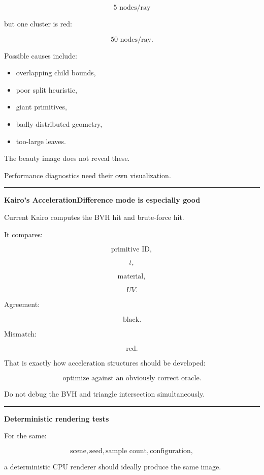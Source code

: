 \[
5\text{ nodes/ray}
\]

but one cluster is red:

\[
50\text{ nodes/ray}.
\]

Possible causes include:

\begin{itemize}
\tightlist
\item
  overlapping child bounds,
\item
  poor split heuristic,
\item
  giant primitives,
\item
  badly distributed geometry,
\item
  too-large leaves.
\end{itemize}

The beauty image does not reveal these.

Performance diagnostics need their own visualization.

\begin{center}\rule{0.5\linewidth}{0.5pt}\end{center}

\textbf{Kairo's AccelerationDifference mode is especially good}

Current Kairo computes the BVH hit and brute-force hit.

It compares:

\[
\text{primitive ID},
\]

\[
t,
\]

\[
\text{material},
\]

\[
UV.
\]

Agreement:

\[
\text{black}.
\]

Mismatch:

\[
\text{red}.
\]

That is exactly how acceleration structures should be developed:

\[
\boxed{
\text{optimize against an obviously correct oracle}.
}
\]

Do not debug the BVH and triangle intersection simultaneously.

\begin{center}\rule{0.5\linewidth}{0.5pt}\end{center}

\textbf{Deterministic rendering tests}

For the same:

\[
\text{scene},
\text{seed},
\text{sample count},
\text{configuration},
\]

a deterministic CPU renderer should ideally produce the same image.

